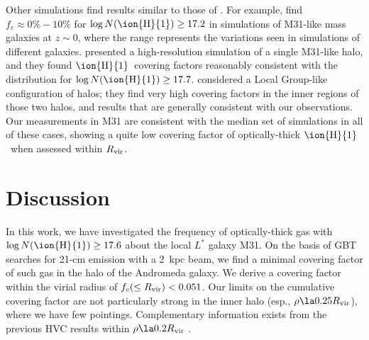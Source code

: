 \documentclass[12pt,preprint]{aastex6}
\newcommand{\virialCovering}{0.051}
\newcommand{\HI}{\ensuremath{\mbox{\ion{H}{1}}}}
\newcommand{\NHI}{\ensuremath{N(\mbox{\ion{H}{1}})}\relax}
\newcommand{\logNHI}{\ensuremath{\log N(\mbox{\ion{H}{1}})}\relax}
\newcommand{\Rvir}{\ensuremath{R_{\rm vir}}\relax}
\newcommand{\lstar}{\ensuremath{L^*}}
\begin{document}
Other simulations find results similar to those of
. For example, \citet{gutcke2016} find
$f_c\approx 0\% - 10\%$ for $\logNHI \ge 17.2$ in simulations of
M31-like mass galaxies at $z\sim0$, where the range represents the
variations seen in simulations of different
galaxies. \citet{fernandez2012} presented a high-resolution simulation
of a single M31-like halo, and they found \HI\ covering factors
reasonably consistent with the \citet{richter2012} distribution for
$\logNHI \ge 17.7$. \citet{nuza2014} considered a Local Group-like
configuration of halos; they find very high covering factors in the
inner regions of those two halos, and results that are generally
consistent with our observations.  Our measurements in M31 are
consistent with the median set of simulations in all of these cases,
showing a quite low covering factor of optically-thick \HI\ when
assessed within \Rvir.

\section{Discussion}
\label{sec:discussion}

In this work, we have investigated the frequency of optically-thick
gas with $\log \NHI \ge 17.6$ about the local $\lstar$ galaxy M31. On
the basis of GBT searches for 21-cm emission with a 2~kpc beam, we
find a minimal covering factor of such gas in the halo of the
Andromeda galaxy. We derive a covering factor within the virial radius
of $f_c (\le \Rvir) < \virialCovering$. Our limits on the cumulative
covering factor are not particularly strong in the inner halo (esp.,
$\rho \la 0.25 \Rvir$), where we have few pointings. Complementary
information exists from the previous HVC results within
$\rho \la 0.2 \Rvir$ \citep{thilker2004, richter2012}.
\end{document}
